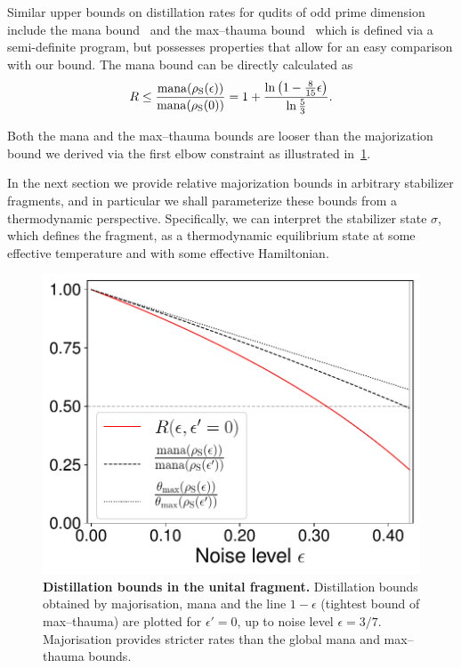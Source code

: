 \documentclass[pra,
aps,
twocolumn,
superscriptaddress,
groupedaddress,
nofootinbib,
reprint
]{revtex4-1}
\begin{document}
Similar upper bounds on distillation rates for qudits of odd prime dimension include the mana bound~\cite{cit:veitch} and the max--thauma bound~\cite{Wang_2020} which is defined via a semi-definite program, but possesses properties that allow for an easy comparison with our bound.
The mana bound can be directly calculated as
\begin{equation}
	R \leq \frac{{{\rm{mana}}(\rho_{\rm{S}}(\epsilon))}}{{{\rm{mana}}(\rho_{\rm{S}}(0))}} = 1 + \frac{\ln \left(1 - \frac{8}{15}\epsilon \right)}{\ln \frac{5}{3}}.
\end{equation}


Both the mana and the max--thauma bounds are looser than the majorization bound we derived via the first elbow constraint as illustrated in~\cref{fig:distill_bounds}. 

In the next section we provide relative majorization bounds in arbitrary stabilizer fragments, and in particular we shall parameterize these bounds from a thermodynamic perspective. Specifically, we can interpret the stabilizer state $\sigma$, which defines the fragment, as a thermodynamic equilibrium state at some effective temperature and with some effective Hamiltonian.
\begin{figure}[t]
    \centering
    \includegraphics[scale=0.45]{figs/distill_bounds.pdf}
    \caption{\textbf{Distillation bounds in the unital fragment.} Distillation bounds obtained by majorisation, mana and the line $1-\epsilon$ (tightest bound of max--thauma) are plotted for $\epsilon' = 0$, up to noise level $\epsilon = 3/7$.
    Majorisation provides stricter rates than the global mana and max--thauma bounds.
    }
    \label{fig:distill_bounds}
\end{figure}
\end{document}
